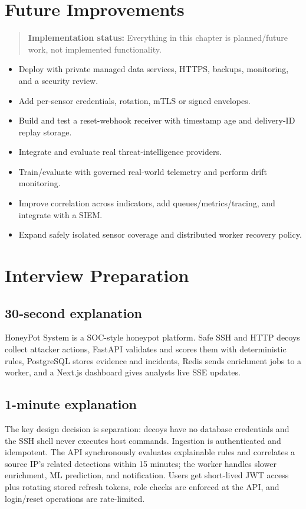 \documentclass[11pt,oneside]{book}
\newcommand{\statusnote}[1]{\begin{quote}\colorbox{hplight}{\parbox{0.92\linewidth}{\textbf{Implementation status:} #1}}\end{quote}}
\begin{document}
\chapter{Future Improvements}
\statusnote{Everything in this chapter is planned/future work, not implemented functionality.}
\begin{itemize}[leftmargin=*]\item Deploy with private managed data services, HTTPS, backups, monitoring, and a security review.\item Add per-sensor credentials, rotation, mTLS or signed envelopes.\item Build and test a reset-webhook receiver with timestamp age and delivery-ID replay storage.\item Integrate and evaluate real threat-intelligence providers.\item Train/evaluate with governed real-world telemetry and perform drift monitoring.\item Improve correlation across indicators, add queues/metrics/tracing, and integrate with a SIEM.\item Expand safely isolated sensor coverage and distributed worker recovery policy.\end{itemize}

\chapter{Interview Preparation}
\section*{30-second explanation}HoneyPot System is a SOC-style honeypot platform. Safe SSH and HTTP decoys collect attacker actions, FastAPI validates and scores them with deterministic rules, PostgreSQL stores evidence and incidents, Redis sends enrichment jobs to a worker, and a Next.js dashboard gives analysts live SSE updates.
\section*{1-minute explanation}The key design decision is separation: decoys have no database credentials and the SSH shell never executes host commands. Ingestion is authenticated and idempotent. The API synchronously evaluates explainable rules and correlates a source IP's related detections within 15 minutes; the worker handles slower enrichment, ML prediction, and notification. Users get short-lived JWT access plus rotating stored refresh tokens, role checks are enforced at the API, and login/reset operations are rate-limited.
\end{document}

